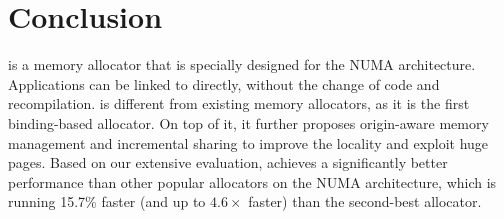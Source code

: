 \section{Conclusion}
\label{sec:conclusion}

\NM{} is a memory allocator that is specially designed for the NUMA architecture. Applications can be linked to \NM{} directly, without the change of code and recompilation. \NM{} is different from existing memory allocators, as it is the first binding-based allocator. 
On top of it, it further proposes origin-aware memory management and incremental sharing to improve the locality and exploit huge pages. 
Based on our extensive evaluation, \NM{} achieves a significantly better performance than other popular allocators on the NUMA architecture, which is running 15.7\% faster (and up to $4.6\times$ faster) than the second-best allocator.
